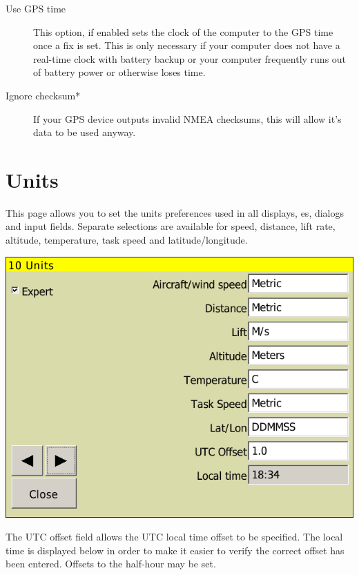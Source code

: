 \documentclass[a4paper,12pt]{refrep}
\begin{document}
\begin{description}
\item[Use GPS time] This option, if enabled sets the clock of the computer to the GPS time once a fix is set.  
This is only necessary if your computer does not have a real-time clock with battery backup or your computer 
frequently runs out of battery power or otherwise loses time.
\item[Ignore checksum*] If your GPS device outputs invalid NMEA checksums, this will allow it's data to be used anyway.
\end{description}

\clearpage
\section{Units}

This page allows you to set the units preferences used in all
displays, {\InfoBox}es, dialogs and input fields.  Separate selections
are available for speed, distance, lift rate, altitude, temperature, task
speed and latitude/longitude.

\begin{center}
\includegraphics[angle=0,width=\linewidth,keepaspectratio='true']{figures/config-units.png}
\end{center}

The UTC offset field allows the UTC local time offset to be specified.
The local time is displayed below in order to make it easier to verify
the correct offset has been entered.  Offsets to the half-hour may be
set.
\end{document}
